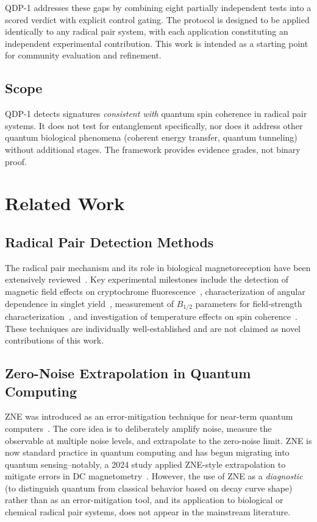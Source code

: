 \documentclass[preprint,amsmath,amssymb]{revtex4-2}
\begin{document}
QDP-1 addresses these gaps by combining eight partially independent tests into a scored verdict with explicit control gating. The protocol is designed to be applied identically to any radical pair system, with each application constituting an independent experimental contribution. This work is intended as a starting point for community evaluation and refinement.

\subsection{Scope}

QDP-1 detects signatures \emph{consistent with} quantum spin coherence in radical pair systems. It does not test for entanglement specifically, nor does it address other quantum biological phenomena (coherent energy transfer, quantum tunneling) without additional stages. The framework provides evidence grades, not binary proof.

\section{Related Work}

\subsection{Radical Pair Detection Methods}

The radical pair mechanism and its role in biological magnetoreception have been extensively reviewed~\cite{rodgers2009,hore2016,wong2023}. Key experimental milestones include the detection of magnetic field effects on cryptochrome fluorescence~\cite{maeda2012}, characterization of angular dependence in singlet yield~\cite{ritz2000}, measurement of $B_{1/2}$ parameters for field-strength characterization~\cite{timmel1998}, and investigation of temperature effects on spin coherence~\cite{dodson2015}. These techniques are individually well-established and are not claimed as novel contributions of this work.

\subsection{Zero-Noise Extrapolation in Quantum Computing}

ZNE was introduced as an error-mitigation technique for near-term quantum computers~\cite{temme2017,giurgica2020}. The core idea is to deliberately amplify noise, measure the observable at multiple noise levels, and extrapolate to the zero-noise limit. ZNE is now standard practice in quantum computing and has begun migrating into quantum sensing--notably, a 2024 study applied ZNE-style extrapolation to mitigate errors in DC magnetometry~\cite{vandyke2024}. However, the use of ZNE as a \emph{diagnostic} (to distinguish quantum from classical behavior based on decay curve shape) rather than as an error-mitigation tool, and its application to biological or chemical radical pair systems, does not appear in the mainstream literature.
\end{document}
